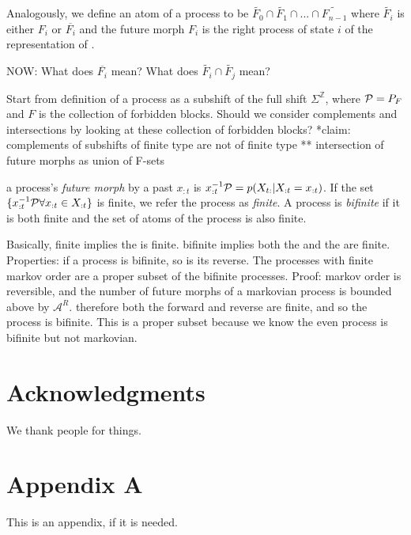 \documentclass[prl,twocolumn,showpacs,superscriptaddress,preprintnumbers,floatfix]{revtex4-1}
\theoremstyle{plain}    \newtheorem{Lem}{Lemma}
\theoremstyle{plain}    \newtheorem*{ProLem}{Proof}
\theoremstyle{plain}    \newtheorem{Cor}{Corollary}
\theoremstyle{plain}    \newtheorem*{ProCor}{Proof}
\theoremstyle{plain}    \newtheorem{The}{Theorem}
\theoremstyle{plain}    \newtheorem*{ProThe}{Proof}
\theoremstyle{plain}    \newtheorem{Prop}{Proposition}
\theoremstyle{plain}    \newtheorem*{ProProp}{Proof}
\theoremstyle{plain}    \newtheorem*{Conj}{Conjecture}
\theoremstyle{plain}    \newtheorem*{Rem}{Remark}
\theoremstyle{plain}    \newtheorem{Def}{Definition}
\theoremstyle{plain}    \newtheorem*{Not}{Notation}
\begin{document}
Analogously, we define an atom of a process \Process to be $\widetilde{F_0} \cap
\widetilde{F_1} \cap ... \cap \widetilde{F_{n-1}}$ where $\widetilde{F_i}$ is
either $F_i$ or $\overline{F_i}$ and the future morph $F_i$ is the right process
of state $i$ of the \eM representation of \Process.

NOW: What does $\overline{F_i}$ mean? What does $\widetilde{F_i} \cap
\widetilde{F_j}$ mean?

Start from definition of a process \Process as a subshift of the full shift
$\Sigma^{\mathbb{Z}}$, where $\mathcal{P} = P_{F}$ and $F$ is the collection of
forbidden blocks.  Should we consider complements and intersections by looking
at these collection of forbidden blocks? *claim: complements of subshifts of
finite type are not of finite type ** intersection of future morphs as union of
F-sets


a process's \emph{future morph} by a past $x_{:t}$ is $x_{:t}^{-1}\mathcal{P} =
p(X_{t:} | X_{:t} = x_{:t})$. If the set $\{ x_{:t}^{-1}\mathcal{P} \forall x_{:t}
\in X_{:t} \}$ is finite, we refer the process as \emph{finite}. A process is
\emph{bifinite} if it is both finite and the set of atoms of the process is also
finite.

Basically, finite implies the \eM is finite. bifinite implies both the
\eM and the \eT are finite. Properties: if a process is bifinite, so
is its reverse. The processes with finite markov order are a proper subset of
the bifinite processes. Proof: markov order is reversible, and the number of
future morphs of a markovian process is bounded above by $\mathcal{A}^R$.
therefore both the forward and reverse \eMs are finite, and so the
process is bifinite. This is a proper subset because we know the even process is
bifinite but not markovian.

\section*{Acknowledgments}
\label{sec:acknowledgments}

We thank people for things.



\cleardoublepage

\appendix

\section{Appendix A}
\label{sec:appendix_a}

This is an appendix, if it is needed.
\end{document}
